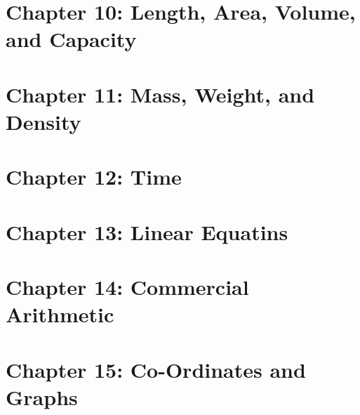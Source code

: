 \documentclass[
  letterpaper,
  DIV=11,
  numbers=noendperiod]{scrreprt}
\begin{document}

\hypertarget{chapter-10-length-area-volume-and-capacity}{%
\section*{Chapter 10: Length, Area, Volume, and
Capacity}\label{chapter-10-length-area-volume-and-capacity}}


\hypertarget{chapter-11-mass-weight-and-density}{%
\section*{Chapter 11: Mass, Weight, and
Density}\label{chapter-11-mass-weight-and-density}}


\hypertarget{chapter-12-time}{%
\section*{Chapter 12: Time}\label{chapter-12-time}}


\hypertarget{chapter-13-linear-equatins}{%
\section*{Chapter 13: Linear
Equatins}\label{chapter-13-linear-equatins}}


\hypertarget{chapter-14-commercial-arithmetic}{%
\section*{Chapter 14: Commercial
Arithmetic}\label{chapter-14-commercial-arithmetic}}


\hypertarget{chapter-15-co-ordinates-and-graphs}{%
\section*{Chapter 15: Co-Ordinates and
Graphs}\label{chapter-15-co-ordinates-and-graphs}}
\end{document}

